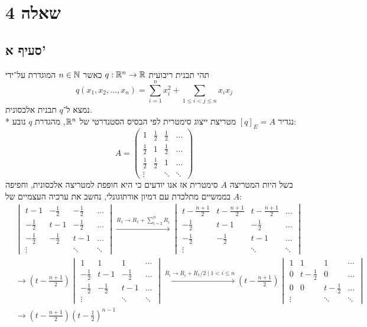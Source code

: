 \section{שאלה 4}
\subsection{סעיף א'}
תהי תבנית ריבועית $q: \mathbb{R}^n \to \mathbb{R}$ כאשר $n \in \mathbb{N}$ המוגדרת על־ידי
\[
	q(x_1, x_2, \ldots, x_n) = \sum_{i = 1}^n x_i^2 + \sum_{1 \le i < j \le n} x_i x_j
\]
נמצא ל־$q$ תבנית אלכסונית. \\*
נגדיר ${[q]}_E = A$ מטריצת ייצוג סימטרית לפי הבסיס הסטנדרטי של $\mathbb{R}^n$, מהגדרת $q$ נובע:
\[
	A = \begin{pmatrix}
		1  & \frac{1}{2} & \frac{1}{2} & \hdots \\
		\frac{1}{2} & 1 & \frac{1}{2} & \hdots \\
		\frac{1}{2} & \frac{1}{2} & 1 & \hdots \\
		\vdots & & \ddots & \ddots
	\end{pmatrix}
\]
בשל היות המטריצה $A$ סימטרית אז אנו יודעים כי היא חופפת למטריצה אלכסונית, וחפיפה בממשיים מתלכדת עם דמיון אורתוגונלי, נחשב את ערכיה העצמיים של $A$:
\begin{align*}
	& \begin{vmatrix}
		t - 1  & -\frac{1}{2} & -\frac{1}{2} & \hdots \\
		-\frac{1}{2} & t - 1 & -\frac{1}{2} & \hdots \\
		-\frac{1}{2} & -\frac{1}{2} & t - 1 & \hdots \\
		\vdots & & \ddots & \ddots
	\end{vmatrix}
	\xrightarrow{R_1 \to R_1 + \sum_{i = 2}^n R_i}
	\begin{vmatrix}
		t - \frac{n + 1}{2} & t - \frac{n + 1}{2} & t - \frac{n + 1}{2} & \hdots \\
		-\frac{1}{2} & t - 1 & -\frac{1}{2} & \hdots \\
		-\frac{1}{2} & -\frac{1}{2} & t - 1 & \hdots \\
		\vdots & & \ddots & \ddots
	\end{vmatrix} \\
	& \rightarrow
	\left(t - \frac{n + 1}{2}\right)
	\begin{vmatrix}
		1 & 1 & 1 & \cdots \\
		-\frac{1}{2} & t - 1 & -\frac{1}{2} & \hdots \\
		-\frac{1}{2} & -\frac{1}{2} & t - 1 & \hdots \\
		\vdots & & \ddots & \ddots
	\end{vmatrix}
	\xrightarrow{R_i \to R_i + R_1/2 \mid 1 < i \le n}
	\left(t - \frac{n + 1}{2}\right)
	\begin{vmatrix}
		1 & 1 & 1 & \cdots \\
		0 & t - \frac{1}{2} & 0 & \hdots \\
		0 & 0 & t - \frac{1}{2} & \hdots \\
		\vdots & & \ddots & \ddots
	\end{vmatrix} \\
	& \rightarrow
	\left(t - \frac{n + 1}{2}\right)
{\left(t - \frac{1}{2}\right)}^{n - 1}
\end{align*}
